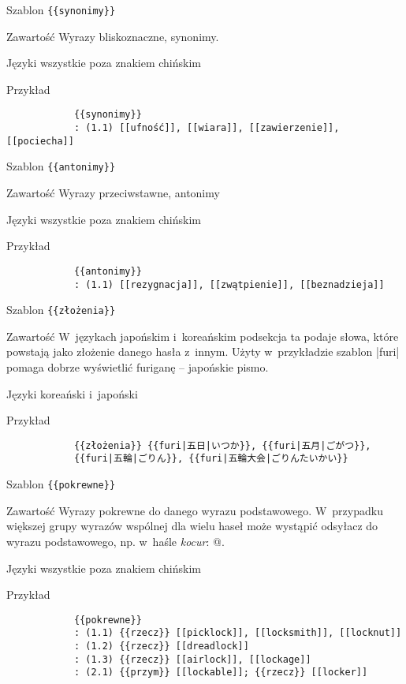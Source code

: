 \documentclass{pracamgr}
\begin{document}
\spacer
\begin{opis}
	\item[Szablon] \verb|{{synonimy}}|
	\item[Zawartość] Wyrazy bliskoznaczne, synonimy.
	\item[Języki] wszystkie poza znakiem chińskim
	\item[Przykład]
		\begin{verbatim}
			{{synonimy}}
			: (1.1) [[ufność]], [[wiara]], [[zawierzenie]], [[pociecha]]
		\end{verbatim}
\end{opis}
\spacer
\begin{opis}
	\item[Szablon] \verb|{{antonimy}}|
	\item[Zawartość] Wyrazy przeciwstawne, antonimy
	\item[Języki] wszystkie poza znakiem chińskim
	\item[Przykład]
		\begin{verbatim}
			{{antonimy}}
			: (1.1) [[rezygnacja]], [[zwątpienie]], [[beznadzieja]]
		\end{verbatim}
\end{opis}
\spacer
\begin{opis}
	\item[Szablon] \verb|{{złożenia}}|
	\item[Zawartość] W~językach japońskim i~koreańskim podsekcja ta podaje słowa, które powstają jako złożenie danego hasła z~innym. Użyty w~przykładzie szablon \kod|{{furi}}| pomaga dobrze wyświetlić furiganę -- japońskie pismo.
	\item[Języki] koreański i~japoński
	\item[Przykład]
		\begin{verbatim}
			{{złożenia}} {{furi|五日|いつか}}, {{furi|五月|ごがつ}},
			{{furi|五輪|ごりん}}, {{furi|五輪大会|ごりんたいかい}}
		\end{verbatim}
\end{opis}
\spacer
\begin{opis}
	\item[Szablon] \verb|{{pokrewne}}|
	\item[Zawartość] Wyrazy pokrewne do danego wyrazu podstawowego. W~przypadku większej grupy wyrazów wspólnej dla wielu haseł może wystąpić odsyłacz do wyrazu podstawowego, np. w~haśle \emph{kocur}: @.
	\item[Języki] wszystkie poza znakiem chińskim
	\item[Przykład]
		\begin{verbatim}
			{{pokrewne}}
			: (1.1) {{rzecz}} [[picklock]], [[locksmith]], [[locknut]]
			: (1.2) {{rzecz}} [[dreadlock]]
			: (1.3) {{rzecz}} [[airlock]], [[lockage]]
			: (2.1) {{przym}} [[lockable]]; {{rzecz}} [[locker]]
		\end{verbatim}
\end{opis}
\end{document}
